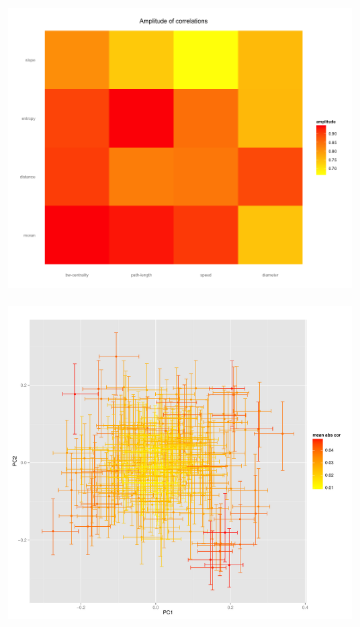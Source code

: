 \begin{figure}
\begin{subfigure}[t]{0.23\linewidth}
\includegraphics[width=\textwidth]{figures/heatmap_amplCor}
\caption{}
\end{subfigure}
\begin{subfigure}[t]{0.4\linewidth}
\includegraphics[width=\textwidth]{figures/pca_meanAbsCor_errorBars}
\caption{}
\end{subfigure}\\
\begin{subfigure}[t]{0.54\linewidth}

\end{subfigure}
\end{figure}
